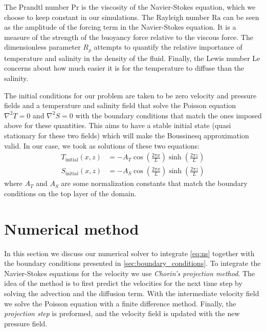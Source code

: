 \documentclass{article}
\def\Ra{\mathrm{Ra}}
\def\Pr{\mathrm{Pr}}
\def\Le{\mathrm{Le}}
\begin{document}
The Prandtl number $\Pr$ is the viscosity of the Navier-Stokes equation, which we choose to keep constant in our simulations. The Rayleigh number $\Ra$ can be seen as the amplitude of the forcing term in the Navier-Stokes equation. It is a measure of the strength of the buoyancy force relative to the viscous force. The dimensionless parameter $R_\rho$ attempts to quantify the relative importance of temperature and salinity in the density of the fluid. Finally, the Lewis number $\Le$ concerns about how much easier it is for the temperature to diffuse than the salinity.

The initial conditions for our problem are taken to be zero velocity and pressure fields and a temperature and salinity field that solve the Poisson equation $\nabla^2T = 0$ and $\nabla^2S = 0$ with the boundary conditions that match the ones imposed above for these quantities. This aims to have a stable initial state (quasi stationary for these two fields) which will make the Boussinesq approximation valid. In our case, we took as solutions of these two equations:
\begin{equation}
  \begin{aligned}
    T_\mathrm{initial}(x,z) & = -A_T \cos\left(\frac{2\pi x}{L}\right) \sinh\left(\frac{2\pi z}{L}\right) \\
    S_\mathrm{initial}(x,z) & = -A_S \cos\left(\frac{2\pi x}{L}\right) \sinh\left(\frac{2\pi z}{L}\right)
  \end{aligned}
\end{equation}
where $A_T$ and $A_S$ are some normalization constants that match the boundary conditions on the top layer of the domain.

\section{Numerical method}

In this section we discuss our numerical solver to integrate \cref{eq:ns} together with the boundary conditions presented in \cref{sec:boundary_conditions}. To integrate the Navier-Stokes equations for the velocity we use \textit{Chorin's projection method}. The idea of the method is to first predict the velocities for the next time step by solving the advection and the diffusion term. With the intermediate velocity field we solve the Poisson equation with a finite difference method. Finally, the \textit{projection step} is preformed, and the velocity field is updated with the new pressure field.
\end{document}
